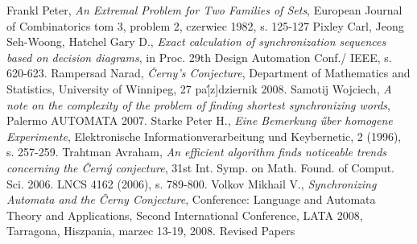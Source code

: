 \documentclass[12pt,a4paper]{article}
\begin{document}
\begin{thebibliography}{99}
 Frankl Peter, \textit{An Extremal Problem for Two Families of Sets}, European Journal of Combinatorics
tom 3, problem 2, czerwiec 1982, s. 125-127
 Pixley Carl, Jeong Seh-Woong, Hatchel Gary D., \textit{Exact calculation of synchronization sequences based on decision diagrams}, in Proc. 29th Design Automation Conf./ IEEE, s. 620-623.
 Rampersad Narad, \textit{\v Cerny's Conjecture}, Department of Mathematics and Statistics, University of Winnipeg, 27 pa\'[z]dziernik 2008.
 Samotij Wojciech, \textit{A note on the complexity of the problem of finding shortest synchronizing words}, Palermo AUTOMATA 2007. 
 Starke Peter H., \textit{Eine Bemerkung \H uber homogene Experimente}, Elektronische Informationverarbeitung und Keybernetic, 2 (1996), s. 257-259.
 Trahtman Avraham, \textit{An efficient algorithm finds noticeable trends concerning the \v Cern\'y conjecture}, 31st Int. Symp. on Math. Found. of Comput. Sci. 2006. LNCS 4162 (2006), s. 789-800. 
 Volkov Mikhail V., \textit{Synchronizing Automata and the \v Cerny Conjecture}, Conference: Language and Automata Theory and Applications, Second International Conference, LATA 2008, Tarragona, Hiszpania, marzec 13-19, 2008. Revised Papers
\end{thebibliography}
\end{document}
